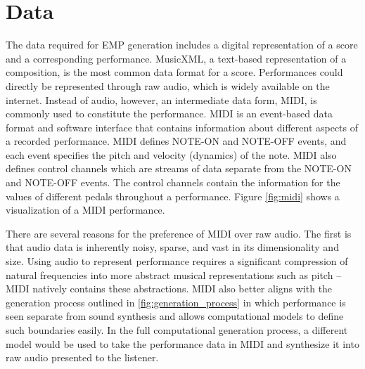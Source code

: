 \section{Data}
The data required for EMP generation includes a digital representation of a score and a corresponding performance. MusicXML, a text-based representation of a composition, is the most common data format for a score. Performances could directly be represented through raw audio, which is widely available on the internet. Instead of audio, however, an intermediate data form, MIDI, is commonly used to constitute the performance. MIDI is an event-based data format and software interface that contains information about different aspects of a recorded performance. MIDI defines NOTE-ON and NOTE-OFF events, and each event specifies the pitch and velocity (dynamics) of the note. MIDI also defines control channels which are streams of data separate from the NOTE-ON and NOTE-OFF events. The control channels contain the information for the values of different pedals throughout a performance. Figure \ref{fig:midi} shows a visualization of a MIDI performance. 

There are several reasons for the preference of MIDI over raw audio. The first is that audio data is inherently noisy, sparse, and vast in its dimensionality and size. Using audio to represent performance requires a significant compression of natural frequencies into more abstract musical representations such as pitch -- MIDI natively contains these abstractions. MIDI also better aligns with the generation process outlined in \ref{fig:generation_process} in which performance is seen separate from sound synthesis and allows computational models to define such boundaries easily. In the full computational generation process, a different model would be used to take the performance data in MIDI and synthesize it into raw audio presented to the listener. 

